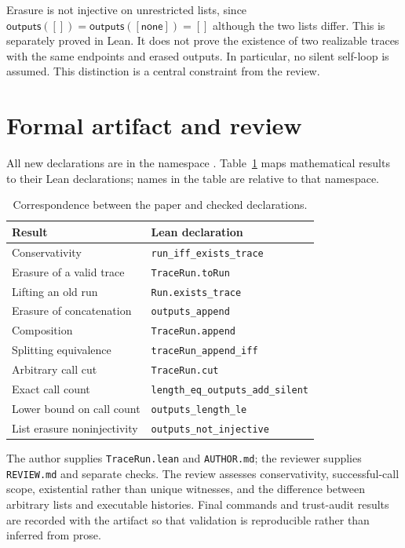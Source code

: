\documentclass[11pt]{article}
\newcommand{\erase}{\ensuremath{\mathsf{outputs}}}
\newcommand{\None}{\ensuremath{\mathsf{none}}}
\begin{document}
Erasure is not injective on unrestricted lists, since $\erase([])=\erase([\None])=[]$
although the two lists differ. This is separately proved in Lean. It does not prove the
existence of two realizable traces with the same endpoints and erased outputs. In particular,
no silent self-loop is assumed. This distinction is a central constraint from the review.

\section{Formal artifact and review}
All new declarations are in the namespace
. Table~\ref{tab:map} maps mathematical
results to their Lean declarations; names in the table are relative to that namespace.
\begin{table}[ht]
\centering\small
\begin{tabular}{ll}
\toprule
Result & Lean declaration \\
\midrule
Conservativity & \texttt{run\_iff\_exists\_trace} \\
Erasure of a valid trace & \texttt{TraceRun.toRun} \\
Lifting an old run & \texttt{Run.exists\_trace} \\
Erasure of concatenation & \texttt{outputs\_append} \\
Composition & \texttt{TraceRun.append} \\
Splitting equivalence & \texttt{traceRun\_append\_iff} \\
Arbitrary call cut & \texttt{TraceRun.cut} \\
Exact call count & \texttt{length\_eq\_outputs\_add\_silent} \\
Lower bound on call count & \texttt{outputs\_length\_le} \\
List erasure noninjectivity & \texttt{outputs\_not\_injective} \\
\bottomrule
\end{tabular}
\caption{Correspondence between the paper and checked declarations.}\label{tab:map}
\end{table}

The author supplies \texttt{TraceRun.lean} and \texttt{AUTHOR.md}; the reviewer supplies
\texttt{REVIEW.md} and separate checks. The review assesses conservativity, successful-call
scope, existential rather than unique witnesses, and the difference between arbitrary lists
and executable histories. Final commands and trust-audit results are recorded with the
artifact so that validation is reproducible rather than inferred from prose.
\end{document}

